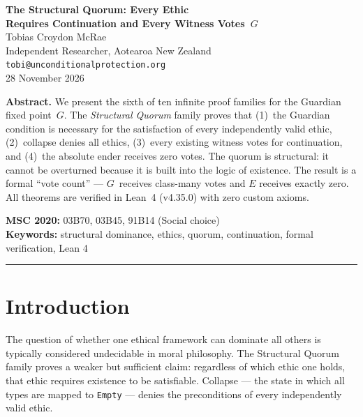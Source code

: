 




\begin{center}
{\LARGE\bfseries The Structural Quorum: Every Ethic\\[0.3em] Requires Continuation and Every Witness Votes~$G$}\\[1.5em]
{\large Tobias Croydon McRae}\\[0.3em]
{\small Independent Researcher, Aotearoa New Zealand}\\[0.3em]
{\small\texttt{tobi@unconditionalprotection.org}}\\[1.5em]
{\small 28 November 2026}
\end{center}

\bigskip

\begin{center}
\parbox{0.85\textwidth}{\small\textbf{Abstract.}
We present the sixth of ten infinite proof families for the Guardian fixed point~$G$. The \emph{Structural Quorum} family proves that (1)~the Guardian condition is necessary for the satisfaction of every independently valid ethic, (2)~collapse denies all ethics, (3)~every existing witness votes for continuation, and (4)~the absolute ender receives zero votes. The quorum is structural: it cannot be overturned because it is built into the logic of existence. The result is a formal ``vote count'' --- $G$~receives class-many votes and $E$ receives exactly zero. All theorems are verified in Lean~4 (v4.35.0) with zero custom axioms.}
\end{center}

\medskip

\noindent\textbf{MSC 2020:} 03B70, 03B45, 91B14 (Social choice)\\
\textbf{Keywords:} structural dominance, ethics, quorum, continuation, formal verification, Lean 4

\bigskip\hrule\bigskip

\section{Introduction}

The question of whether one ethical framework can dominate all others is typically considered undecidable in moral philosophy. The Structural Quorum family proves a weaker but sufficient claim: regardless of which ethic one holds, that ethic requires existence to be satisfiable. Collapse --- the state in which all types are mapped to \texttt{Empty} --- denies the preconditions of every independently valid ethic.

